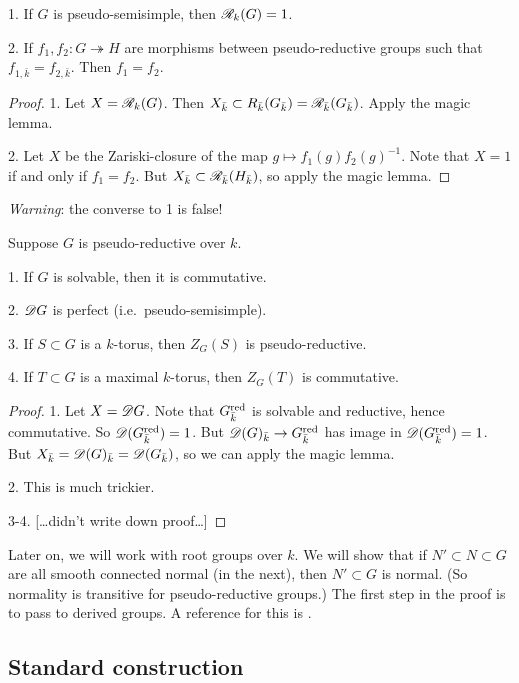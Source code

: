 \begin{coro}
1. If $G$ is pseudo-semisimple, then $\mathscr{R}_k(G)=1$. 

2. If $f_1,f_2:G\twoheadrightarrow H$ are morphisms between pseudo-reductive 
groups such that $f_{1,\bar k}=f_{2,\bar k}$. Then $f_1=f_2$. 
\end{coro}
\begin{proof}
1. Let $X=\mathscr{R}_k(G)$. Then 
$X_{\bar k}\subset R_{\bar k}(G_{\bar k}) = \mathscr{R}_{\bar k}(G_{\bar k})$. Apply the 
magic lemma. 

2. Let $X$ be the Zariski-closure of the map $g\mapsto f_1(g) f_2(g)^{-1}$. Note 
that $X=1$ if and only if $f_1=f_2$. But 
$X_{\bar k}\subset \mathscr{R}_{\bar k}(H_{\bar k})$, so apply the magic lemma. 
\end{proof}

\emph{Warning}: the converse to 1 is false!

\begin{theo}
Suppose $G$ is pseudo-reductive over $k$. 

1. If $G$ is solvable, then it is commutative. 

2. $\mathscr{D} G$ is perfect (i.e.\ pseudo-semisimple). 

3. If $S\subset G$ is a $k$-torus, then $Z_G(S)$ is pseudo-reductive. 

4. If $T\subset G$ is a maximal $k$-torus, then $Z_G(T)$ is commutative. 
\end{theo}
\begin{proof}
1. Let $X=\mathscr{D} G$. Note that $G_{\bar k}^{\mathrm{red}}$ is solvable and reductive, 
hence commutative. So $\mathscr{D}(G_{\bar k}^{\mathrm{red}})=1$. But 
$\mathscr{D}(G)_{\bar k} \to G_{\bar k}^{\mathrm{red}}$ has image in $\mathscr{D}(G_{\bar k}^{\mathrm{red}})=1$. 
But $X_{\bar k}=\mathscr{D}(G)_{\bar k} = \mathscr{D}(G_{\bar k})$, so we can apply the 
magic lemma. 

2. This is much trickier. 

3-4. [\ldots didn't write down proof\ldots]
\end{proof}

Later on, we will work with root groups over $k$. We will show that if 
$N'\subset N\subset G$ are all smooth connected normal (in the next), then 
$N'\subset G$ is normal. (So normality is transitive for pseudo-reductive 
groups.) The first step in the proof is to pass to derived groups. A 
reference for this is \cite[1.2.7,3.1.10]{cgp10}. 





\subsection{Standard construction}

